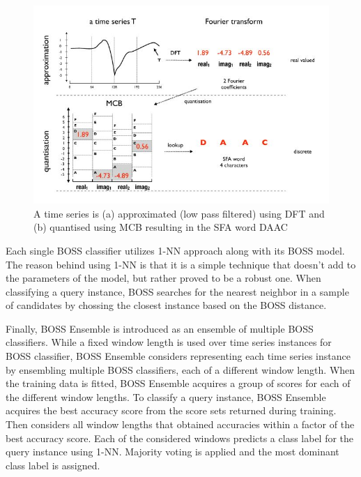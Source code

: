 \begin{figure}[!htbp]
    \captionsetup{justification=raggedright}
    \centering
    \includegraphics[scale = 0.5]{BOSS_SFA.JPG}
    \centering
    \caption{A time series is (a) approximated (low pass filtered) using DFT and (b) quantised using MCB resulting in the SFA word DAAC \cite{schafer2015boss}}
    \label{Img:BOSS_SFA}
\end{figure}

Each single BOSS classifier utilizes 1-NN approach along with its BOSS model. The reason behind using 1-NN is that it is a simple technique 
that doesn't add to the parameters of the model, but rather proved to be a robust one. When classifying a query instance, BOSS searches
for the nearest neighbor in a sample of candidates by chossing the closest instance based on the BOSS distance.

Finally, BOSS Ensemble is introduced as an ensemble of multiple BOSS classifiers. While a fixed window length is used over time series instances for BOSS classifier,
BOSS Ensemble considers representing each time series instance by ensembling multiple BOSS classifiers, each of a different window length.
When the training data is fitted, BOSS Ensemble acquires a group of scores for each of the different window lengths.
To classify a query instance, BOSS Ensemble acquires the best accuracy score from the score sets returned during training.
Then considers all window lengths that obtained accuracies within a factor of the best accuracy score.
Each of the considered windows predicts a class label for the query instance using 1-NN. Majority voting is applied and the most dominant
class label is assigned.

